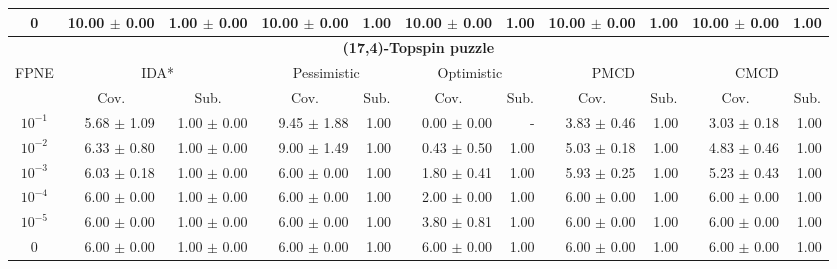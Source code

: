 \documentclass[letterpaper]{article}
\begin{document}
\begin{table}[t]
\begin{tabular}{| c | r  r | r  r | r  r | r  r | r  r |}
0 	& 10.00 $\pm$ 0.00	& 1.00  $\pm$ 0.00 	& 10.00 $\pm$ 0.00	& 1.00 	& 10.00 $\pm$ 0.00	& 1.00 	& 10.00 $\pm$ 0.00	& 1.00 	& 10.00 $\pm$ 0.00	& 1.00 	\\

\hline
\hline
\multicolumn{11}{|c|}{\textbf{(17,4)-Topspin puzzle}} \\
\hline
\multirow{2}{*}{FPNE}	& \multicolumn{2}{|c|}{IDA*} 	& \multicolumn{2}{|c|}{Pessimistic} 	& \multicolumn{2}{|c|}{Optimistic} 	& \multicolumn{2}{|c|}{PMCD} 	& \multicolumn{2}{|c|}{CMCD} 	\\
\cline{2-11} 
	& \multicolumn{1}{c}{Cov.} & \multicolumn{1}{c|}{Sub.} 	& \multicolumn{1}{c}{Cov.} & \multicolumn{1}{c|}{Sub.} 	& \multicolumn{1}{c}{Cov.} & \multicolumn{1}{c|}{Sub.} 	& \multicolumn{1}{c}{Cov.} & \multicolumn{1}{c|}{Sub.} 	& \multicolumn{1}{c}{Cov.} & \multicolumn{1}{c|}{Sub.} 	\\
\hline
$10^{-1}$	& 5.68 $\pm$ 1.09	& 1.00 $\pm$ 0.00	& 9.45 $\pm$ 1.88	& 1.00	& 0.00 $\pm$ 0.00	& - 	& 3.83 $\pm$ 0.46	& 1.00	& 3.03 $\pm$ 0.18	& 1.00	\\

$10^{-2}$	& 6.33 $\pm$ 0.80	& 1.00 $\pm$ 0.00	& 9.00 $\pm$ 1.49	& 1.00	& 0.43 $\pm$ 0.50	& 1.00	& 5.03 $\pm$ 0.18	& 1.00	& 4.83 $\pm$ 0.46	& 1.00	\\

$10^{-3}$	& 6.03 $\pm$ 0.18	& 1.00 $\pm$ 0.00	& 6.00 $\pm$ 0.00	& 1.00	& 1.80 $\pm$ 0.41	& 1.00	& 5.93 $\pm$ 0.25	& 1.00	& 5.23 $\pm$ 0.43	& 1.00	\\

$10^{-4}$	& 6.00 $\pm$ 0.00	& 1.00 $\pm$ 0.00	& 6.00 $\pm$ 0.00	& 1.00	& 2.00 $\pm$ 0.00	& 1.00	& 6.00 $\pm$ 0.00	& 1.00	& 6.00 $\pm$ 0.00	& 1.00	\\

$10^{-5}$	& 6.00 $\pm$ 0.00	& 1.00 $\pm$ 0.00	& 6.00 $\pm$ 0.00	& 1.00	& 3.80 $\pm$ 0.81	& 1.00	& 6.00 $\pm$ 0.00	& 1.00	& 6.00 $\pm$ 0.00	& 1.00	\\

0 	& 6.00 $\pm$ 0.00	& 1.00  $\pm$ 0.00 	& 6.00 $\pm$ 0.00	& 1.00 	& 6.00 $\pm$ 0.00	& 1.00 	& 6.00 $\pm$ 0.00	& 1.00 	& 6.00 $\pm$ 0.00	& 1.00 	\\




\end{tabular}
\end{table}
\end{document}
